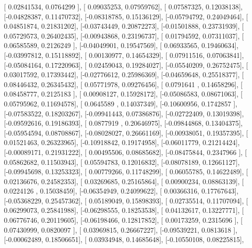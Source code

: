 \documentclass{article}
\begin{document}
       [ 0.02841534,  0.0764299 ],
       [ 0.09035253,  0.07959762],
       [ 0.07587325,  0.12038138],
       [-0.04828387,  0.11470732],
       [-0.08318785,  0.15136129],
       [-0.05794792,  0.24049464],
       [ 0.04851874,  0.21831202],
       [-0.03743449,  0.20872273],
       [-0.01501888,  0.23731939],
       [ 0.05729573,  0.26402435],
       [-0.00943868,  0.23196737],
       [ 0.01794592,  0.07311037],
       [ 0.06585589,  0.2126249 ],
       [-0.04049901,  0.19547569],
       [ 0.06933565,  0.19460634],
       [-0.03997812,  0.15118892],
       [ 0.00130977,  0.14654329],
       [ 0.07911516,  0.07063841],
       [-0.05084164,  0.17220963],
       [ 0.02459043,  0.19284027],
       [-0.05540209,  0.26752475],
       [ 0.03017592,  0.17393442],
       [-0.02776612,  0.25986369],
       [-0.04659648,  0.25518377],
       [ 0.08446432,  0.26345432],
       [ 0.05771978,  0.09276456],
       [ 0.0791641 ,  0.14658296],
       [ 0.08458777,  0.2125183 ],
       [ 0.00908127,  0.15928172],
       [-0.05086583,  0.08671063],
       [ 0.05795962,  0.11694578],
       [ 0.0645589 ,  0.14037349],
       [-0.10600956,  0.1742857 ],
       [-0.07583522,  0.18203267],
       [-0.09941443,  0.07386876],
       [-0.02722409,  0.13019398],
       [-0.09592616,  0.19186393],
       [ 0.0877919 ,  0.20646975],
       [-0.09844868,  0.13404375],
       [-0.05954594,  0.08708867],
       [-0.08028027,  0.26661169],
       [-0.00938051,  0.19357395],
       [ 0.01521463,  0.26323965],
       [-0.10918842,  0.19174958],
       [-0.06011779,  0.21214424],
       [-0.00089171,  0.21931222],
       [ 0.00495506,  0.08685682],
       [-0.08475844,  0.2347966 ],
       [ 0.05862682,  0.11503943],
       [ 0.05594783,  0.12016832],
       [-0.08078189,  0.12661127],
       [-0.09945698,  0.13253323],
       [ 0.00779266,  0.11748299],
       [ 0.06055785,  0.14622489],
       [ 0.02136676,  0.24582353],
       [ 0.03269685,  0.25165864],
       [ 0.00900234,  0.08863139],
       [ 0.0224126 ,  0.15038459],
       [-0.06354949,  0.24099622],
       [ 0.00366316,  0.17767643],
       [-0.05368229,  0.25457362],
       [ 0.05189049,  0.15898393],
       [ 0.02735514,  0.11707094],
       [ 0.06299073,  0.25841988],
       [-0.06298555,  0.18253538],
       [ 0.04132617,  0.13227771],
       [ 0.06776746,  0.20119605],
       [-0.06198466,  0.12817852],
       [ 0.00173259,  0.2315696 ],
       [ 0.07430999,  0.0820097 ],
       [ 0.03969815,  0.26667227],
       [-0.09539221,  0.0813618 ],
       [-0.00062489,  0.18506651],
       [ 0.03934948,  0.14685648],
       [-0.10550108,  0.08225815],
\end{document}
